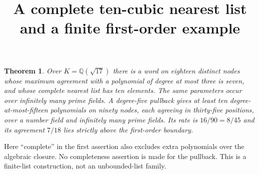 \documentclass[10pt]{article}
\newtheorem{theorem}{Theorem}
\begin{document}
\title{A complete ten-cubic nearest list and a finite first-order example}
\author{}\date{}\maketitle
\begin{theorem}
Over $K=\mathbb Q(\sqrt{17})$ there is a word on eighteen distinct nodes whose maximum agreement with a polynomial of degree at most three is seven, and whose complete nearest list has ten elements. The same parameters occur over infinitely many prime fields. A degree-five pullback gives at least ten degree-at-most-fifteen polynomials on ninety nodes, each agreeing in thirty-five positions, over a number field and infinitely many prime fields. Its rate is $16/90=8/45$ and its agreement $7/18$ lies strictly above the first-order boundary.
\end{theorem}
Here ``complete'' in the first assertion also excludes extra polynomials over the algebraic closure. No completeness assertion is made for the pullback. This is a finite-list construction, not an unbounded-list family.
\end{document}
